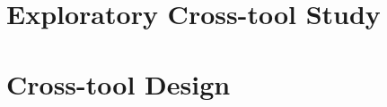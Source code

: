 \documentclass[10pt,a4paper]{report} %
\begin{document}






\chapter{Exploratory Cross-tool Study}

\label{chapter:exploratory_study}

% 











 

 

 

 

 










\chapter{Cross-tool Design}

\label{chapter:design}


\end{document}
